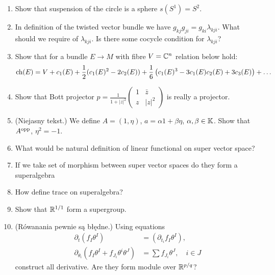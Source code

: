 \documentclass[a4paper,11pt]{article}
\begin{document}
\begin{enumerate}
\item Show that suspension of the circle is a sphere
  $s( S^{ 1 } ) = S^{ 2 }$.

\item In definition of the twisted vector bundle we have
  $g_{ kj } g_{ ji } = g_{ ki } \lambda_{ kji }$. What should we
  require of $\lambda_{ kji }$. Is there some cocycle condition for
  $\lambda_{ kji }$?

\item Show that for a bundle $E \to M$ with fibre $V = \mathbb{C}^{ n }$
  relation below hold:
  \begin{equation}
    \label{DiffGeo:11}
    \textrm{ch}( E ) =
    V + c_{ 1 }( E )
    + \frac{ 1 }{ 2 } ( c_{ 1 }( E )^{ 2 } - 2 c_{ 2 }( E ) )
    + \frac{ 1 }{ 6 } \left( c_{ 1 }( E )^{ 3 } - 3 c_{ 1 }( E ) c_{ 2 }( E )
      + 3 c_{ 3 }( E ) \right) + \ldots
  \end{equation}

\item Show that Bott projector
  $p = \frac{ 1 }{ 1 + \lvert z \rvert^{ 2 } }
  \begin{pmatrix}
    1 & \bar{z} \\
    z & \lvert z \lvert^{ 2 }
  \end{pmatrix}$ is really a projector.

\item (Niejasny tekst.) We define $A = ( 1, \eta )$,
  $a = \alpha 1 + \beta \eta$, $\alpha, \beta \in \mathbb{K}$. Show that
  $A^{ \textrm{opp} }$, $\eta^{ 2 } = -1$.

\item What would be natural definition of linear functional on super
  vector space?

\item If we take set of morphism between super vector spaces do they
  form a superalgebra

\item How define trace on superalgebra?

\item Show that $\mathbb{R}^{ 1 / 1 }$ form a supergroup.

\item (Rówanania pewnie są błędne.) Using equations
  \begin{align}
    \partial_{ t } \left( f_{ I } \theta^{ I } \right)
    &= \left( \partial_{ t_{ i } } f_{ I } \theta^{ I } \right), \\
    \partial_{ \theta_{ i } } \left( f_{ I } \theta^{ I }
    + f_{ J_{ i } } \theta^{ i } \theta^{ J } \right)
    &= \sum f_{ J_{ i } } \theta^{ J }, \quad
      i \in J
  \end{align}
  construct all derivative. Are they form module over
  $\mathbb{R}^{ p / q }$?


\end{enumerate}
\end{document}
